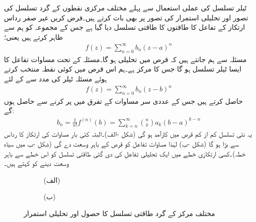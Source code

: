 ٹیلر تسلسل کی عملی استعمال سے پہلے مختلف مرکزی نقطوں کے گرد تسلسل کی تصور  اور تحلیلی استمرار کی تصور  پر بھی بات کرتے ہیں۔فرض کریں غیر صفر رداس ارتکاز  کے تفاعل  کا  طاقتوں کا طاقتی تسلسل  دیا گیا ہے جس کے مجموعہ کو ہم  سے ظاہر کرتے ہیں یعنی؛
\begin{align}\label{مساوات_ٹیلر_دیا_گیا_الف}
f(z)=\sum\limits_{n=0}^{\infty} b_n(z-a)^n
\end{align}
مسئلہ  سے ہم جانتے ہیں کہ  قرص  میں  تحلیلی ہو گا۔مسئلہ  کے تحت مساوات  تفاعل  کا ایسا ٹیلر تسلسل ہو گا جس کا مرکز  ہے۔ہم اس قرص میں کوئی نقطہ  منتخب کرتے ہوئے مسئلہ ٹیلر کی مدد سے   کے لئے 
\begin{align}\label{مساوات_ٹیلر_دیا_گیا_ب}
f(z)=\sum\limits_{n=0}^{\infty} b_n(z-b)^n
\end{align}
حاصل کرتے ہیں جس کے عددی سر  مساوات  کے تفرق میں  پر کرنے سے حاصل ہوں گے:
\begin{align*}
b_n=\frac{1}{n!}f^{(n)}(b)=\sum\limits_{k=n}^{\infty} \binom{ n}{k} a_k (b-a)^{k-n}
\end{align*}
یہ نئی تسلسل کم از کم قرص  میں کارآمد ہو گی (شکل -الف)۔البتہ کئی بار مساوات  کی ارتکاز کا رداس  سے بڑا ہو گا  (شکل -ب) لہٰذا  مساوات  تفاعل  کو  قرص  کے باہر وسعت دے گی (شکل -ب میں سیاہ خطہ)۔کسی ارتکازی خطے میں ایک تحلیلی تفاعل کی دی گئی طاقتی تسلسل  کو اس خطے سے باہر وسعت دینے کو  کہتے ہیں۔
\begin{figure}
\centering
\begin{subfigure}{0.5\textwidth}
\centering
{}
\caption*{(الف)}
\end{subfigure}%
\begin{subfigure}{0.5\textwidth}
\centering
{}
\caption*{(ب)}
\end{subfigure}%
\caption{مختلف مرکز کے گرد طاقتی تسلسل کا حصول اور تحلیلی استمرار}
\label{شکل_ٹیلر_مختلف_مرکز_تسلسل}
\end{figure}

